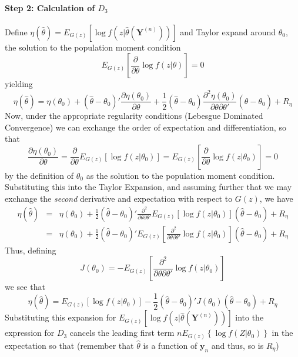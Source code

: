\documentclass[12pt]{article}
\theoremstyle{definition}
\begin{document}
\paragraph{Step 2: Calculation of $D_3$} Define $\eta(\hat{\theta}) = E_{G(z)}\left[ \log{f\left(z|\hat{\theta}(\mathbf{Y}^{(n)})\right)} \right] $ and Taylor expand around $\theta_0$, the solution to the population moment condition
	$$E_{G(z)}\left[ \frac{\partial}{\partial \theta}  \log{f(z|\theta)} \right]=0$$
yielding
	$$\eta(\hat{\theta})= \eta(\theta_0) + \left( \hat{\theta} - \theta_0 \right)' \frac{\partial \eta(\theta_0)}{\partial \theta} + \frac{1}{2}\left( \hat{\theta} - \theta_0 \right)  \frac{\partial^2 \eta(\theta_0)}{\partial \theta \partial \theta'}\left( \hat{\theta} - \theta_0 \right) + R_\eta$$
Now, under the appropriate regularity conditions (Lebesgue Dominated Convergence) we can exchange the order of expectation and differentiation, so that
	$$ \frac{\partial \eta(\theta_0)}{\partial \theta} =  \frac{\partial}{\partial \theta} E_{G(z)}\left[ \log{f(z|\theta_0)} \right]=  E_{G(z)}\left[\frac{\partial}{\partial \theta} \log{f(z|\theta_0)} \right]=0$$
by the definition of $\theta_0$ as the solution to the population moment condition. Substituting this into the Taylor Expansion, and assuming further that we may exchange the \emph{second} derivative and expectation with respect to $G(z)$, we have
	\begin{eqnarray*}
		\eta(\hat{\theta}) &=& \eta(\theta_0) + \frac{1}{2}\left( \hat{\theta} - \theta_0 \right) ' \frac{\partial^2 }{\partial \theta \partial \theta'} E_{G(z)}\left[ \log{f(z|\theta_0)} \right]\left( \hat{\theta} - \theta_0 \right) + R_\eta\\
			&=&  \eta(\theta_0) + \frac{1}{2}\left( \hat{\theta} - \theta_0 \right) ' E_{G(z)}\left[ \frac{\partial^2 }{\partial \theta \partial \theta'} \log{f(z|\theta_0)} \right]\left( \hat{\theta} - \theta_0 \right) + R_\eta
	\end{eqnarray*}
Thus, defining 
	$$J(\theta_0) = -E_{G(z)}\left[ \frac{\partial^2 }{\partial \theta \partial \theta'} \log{f(z|\theta_0)} \right]$$
we see that
	$$\eta(\hat{\theta}) = E_{G(z)}\left[ \log{f\left(z|\theta_0\right)} \right] - \frac{1}{2} \left( \hat{\theta}- \theta_0\right)'J(\theta_0)\left(\hat{\theta}- \theta_0\right) + R_\eta$$
Substituting this expansion for $ E_{G(z)}\left[ \log{f\left(z|\hat{\theta}(\mathbf{Y}^{(n)})\right)} \right]$ into the expression for $D_3$ cancels the leading first term $nE_{G(z)}\left\{  \log{f\left(\left.Z\right|\theta_0\right)}\right\} $ in the expectation so that (remember that $\hat{\theta}$ is a function of $\mathbf{y}_n$ and thus, so is $R_\eta$)
\end{document}
